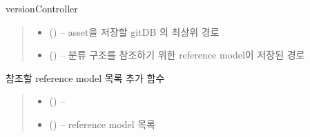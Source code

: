 \documentclass[a4paper,10pt,english]{sphinxmanual}
\begin{document}
\begin{fulllineitems}
\label{\detokenize{_VersionController:VC}}
\pysigstartsignatures
{}
\pysigstopsignatures
\sphinxAtStartPar
versionController
\begin{quote}\begin{description}
\begin{itemize}
\item {} 
\sphinxAtStartPar
{} () – asset을 저장할 gitDB 의 최상위 경로

\item {} 
\sphinxAtStartPar
{} () – 분류 구조를 참조하기 위한 reference model이 저장된 경로

\end{itemize}

\end{description}\end{quote}

\begin{fulllineitems}
\label{\detokenize{_VersionController:VC.addReferenceModel}}
\pysigstartsignatures
{}
\pysigstopsignatures
\sphinxAtStartPar
참조할 reference model 목록 추가 함수
\begin{quote}\begin{description}
\begin{itemize}
\item {} 
\sphinxAtStartPar
{} ({\hyperref[\detokenize{_VersionController:VC}]{}}) – 

\item {} 
\sphinxAtStartPar
{} () – reference model 목록

\end{itemize}


\end{description}
\end{quote}
\end{fulllineitems}
\end{fulllineitems}
\end{document}
